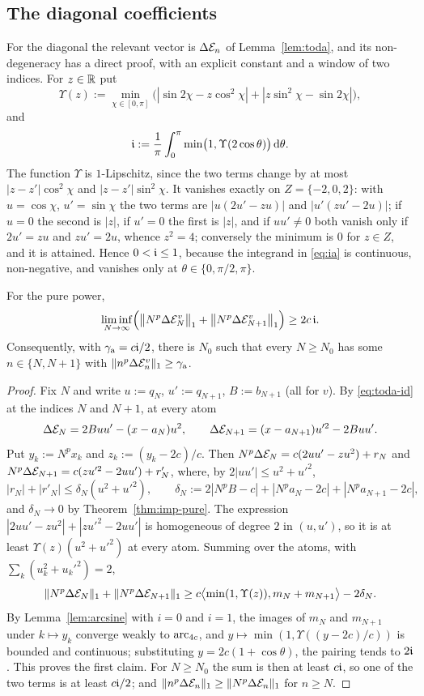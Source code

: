 \subsection{The diagonal coefficients}\label{sec:rough-a}
For the diagonal the relevant vector is $\Delta\mathcal{E}_n$ of Lemma~\ref{lem:toda}, and its non-degeneracy has a direct proof,
with an explicit constant and a window of two indices. For $z\in\mathbb{R}$ put
\[
  \Upsilon(z):=\min_{\chi\in[0,\pi]}\bigl(|\sin2\chi-z\cos^2\chi|+|z\sin^2\chi-\sin2\chi|\bigr),
\]
and
\begin{equation}\label{eq:ia}
  \mathfrak{i}:=\frac1\pi\int_0^\pi\min\bigl(1,\Upsilon(2\cos\theta)\bigr)\,\mathrm{d}\theta .
\end{equation}
The function $\Upsilon$ is $1$-Lipschitz, since the two terms change by at most $|z-z'|\cos^2\chi$ and
$|z-z'|\sin^2\chi$. It vanishes exactly on $Z=\{-2,0,2\}$: with $u=\cos\chi$, $u'=\sin\chi$ the two terms are
$|u(2u'-zu)|$ and $|u'(zu'-2u)|$; if $u=0$ the second is $|z|$, if $u'=0$ the first is $|z|$, and if $uu'\ne0$ both
vanish only if $2u'=zu$ and $zu'=2u$, whence $z^2=4$; conversely the minimum is $0$ for $z\in Z$, and it is attained.
Hence $0<\mathfrak{i}\le1$, because the integrand in \eqref{eq:ia} is continuous, non-negative, and vanishes only at
$\theta\in\{0,\pi/2,\pi\}$.

\begin{lemma}\label{lem:akernel}
For the pure power,
\[
  \liminf_{N\to\infty}\Bigl(\bigl\|N^p\Delta\mathcal{E}^v_N\bigr\|_1+\bigl\|N^p\Delta\mathcal{E}^v_{N+1}\bigr\|_1\Bigr)\ge2c\,\mathfrak{i} .
\]
Consequently, with $\gamma_{\mathrm a}=c\mathfrak{i}/2$, there is $N_0$ such that every $N\ge N_0$ has some $n\in\{N,N+1\}$ with
$\|n^p\Delta\mathcal{E}^v_n\|_1\ge\gamma_{\mathrm a}$.
\end{lemma}

\begin{proof}
Fix $N$ and write $u:=q_N$, $u':=q_{N+1}$, $B:=b_{N+1}$ (all for $v$). By \eqref{eq:toda-id} at the indices $N$ and
$N+1$, at every atom
\[
  \Delta\mathcal{E}_N=2Buu'-(x-a_N)u^2,\qquad \Delta\mathcal{E}_{N+1}=(x-a_{N+1})u'^2-2Buu' .
\]
Put $y_k:=N^px_k$ and $z_k:=(y_k-2c)/c$. Then $N^p\Delta\mathcal{E}_N=c(2uu'-zu^2)+r_N$ and
$N^p\Delta\mathcal{E}_{N+1}=c(zu'^2-2uu')+r'_N$, where, by $2|uu'|\le u^2+u'^2$,
\[
  |r_N|+|r'_N|\le\delta_N(u^2+u'^2),\qquad \delta_N:=2|N^pB-c|+|N^pa_N-2c|+|N^pa_{N+1}-2c| ,
\]
and $\delta_N\to0$ by Theorem~\ref{thm:imp-pure}. The expression $|2uu'-zu^2|+|zu'^2-2uu'|$ is homogeneous of degree
$2$ in $(u,u')$, so it is at least $\Upsilon(z)(u^2+u'^2)$ at every atom. Summing over the atoms, with
$\sum_k(u_k^2+u_k'^2)=2$,
\[
  \|N^p\Delta\mathcal{E}_N\|_1+\|N^p\Delta\mathcal{E}_{N+1}\|_1\ge c\bigl\langle\min(1,\Upsilon(z)),m_N+m_{N+1}\bigr\rangle-2\delta_N .
\]
By Lemma~\ref{lem:arcsine} with $i=0$ and $i=1$, the images of $m_N$ and $m_{N+1}$ under $k\mapsto y_k$ converge weakly
to $\operatorname{arc}_{4c}$, and $y\mapsto\min(1,\Upsilon((y-2c)/c))$ is bounded and continuous; substituting $y=2c(1+\cos\theta)$,
the pairing tends to $2\mathfrak{i}$. This proves the first claim. For $N\ge N_0$ the sum is then at least $c\mathfrak{i}$, so one of the
two terms is at least $c\mathfrak{i}/2$; and $\|n^p\Delta\mathcal{E}_n\|_1\ge\|N^p\Delta\mathcal{E}_n\|_1$ for $n\ge N$.
\end{proof}

